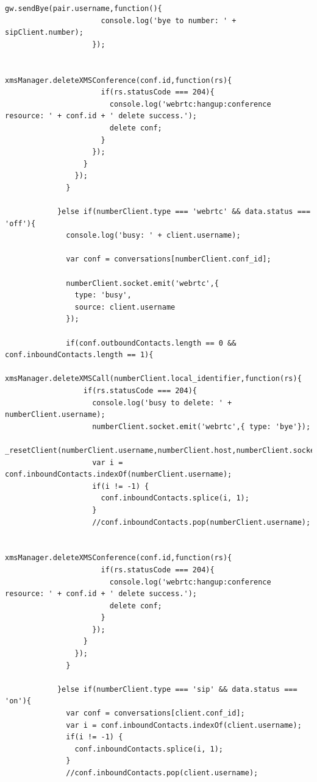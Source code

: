 \begin{appendices}
\begin{lstlisting}[caption={socket.js on Application Server},label={code:server_socket}]
                    gw.sendBye(pair.username,function(){
                      console.log('bye to number: ' + sipClient.number);
                    });

                    xmsManager.deleteXMSConference(conf.id,function(rs){
                      if(rs.statusCode === 204){
                        console.log('webrtc:hangup:conference resource: ' + conf.id + ' delete success.');
                        delete conf;
                      }
                    });
                  }
                });
              }

            }else if(numberClient.type === 'webrtc' && data.status === 'off'){
              console.log('busy: ' + client.username);

              var conf = conversations[numberClient.conf_id];

              numberClient.socket.emit('webrtc',{ 
                type: 'busy',
                source: client.username
              });

              if(conf.outboundContacts.length == 0 && conf.inboundContacts.length == 1){
                xmsManager.deleteXMSCall(numberClient.local_identifier,function(rs){
                  if(rs.statusCode === 204){
                    console.log('busy to delete: ' + numberClient.username);
                    numberClient.socket.emit('webrtc',{ type: 'bye'});
                    _resetClient(numberClient.username,numberClient.host,numberClient.socket,numberClient.delivery);
                    var i = conf.inboundContacts.indexOf(numberClient.username);
                    if(i != -1) {
                      conf.inboundContacts.splice(i, 1);
                    }
                    //conf.inboundContacts.pop(numberClient.username);

                    xmsManager.deleteXMSConference(conf.id,function(rs){
                      if(rs.statusCode === 204){
                        console.log('webrtc:hangup:conference resource: ' + conf.id + ' delete success.');
                        delete conf;
                      }
                    });
                  }
                });
              }

            }else if(numberClient.type === 'sip' && data.status === 'on'){
              var conf = conversations[client.conf_id];
              var i = conf.inboundContacts.indexOf(client.username);
              if(i != -1) {
                conf.inboundContacts.splice(i, 1);
              }
              //conf.inboundContacts.pop(client.username);


\end{lstlisting}
\end{appendices}
